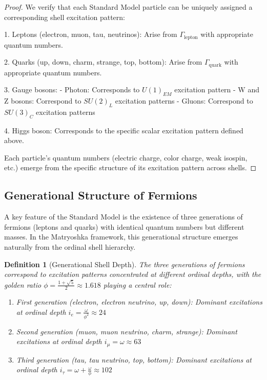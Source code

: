 \documentclass[12pt,a4paper]{article}
\newtheorem{definition}{Definition}[section]
\begin{document}
\begin{proof}
We verify that each Standard Model particle can be uniquely assigned a corresponding shell excitation pattern:

1. Leptons (electron, muon, tau, neutrinos): Arise from $\Gamma_{\text{lepton}}$ with appropriate quantum numbers.

2. Quarks (up, down, charm, strange, top, bottom): Arise from $\Gamma_{\text{quark}}$ with appropriate quantum numbers.

3. Gauge bosons:
   - Photon: Corresponds to $U(1)_{EM}$ excitation pattern
   - W and Z bosons: Correspond to $SU(2)_L$ excitation patterns
   - Gluons: Correspond to $SU(3)_C$ excitation patterns

4. Higgs boson: Corresponds to the specific scalar excitation pattern defined above.

Each particle's quantum numbers (electric charge, color charge, weak isospin, etc.) emerge from the specific structure of its excitation pattern across shells.
\end{proof}

\subsection{Generational Structure of Fermions}
\label{subsec:generations}

A key feature of the Standard Model is the existence of three generations of fermions (leptons and quarks) with identical quantum numbers but different masses. In the Matryoshka framework, this generational structure emerges naturally from the ordinal shell hierarchy.

\begin{definition}[Generational Shell Depth]
\label{def:generation-depth}
The three generations of fermions correspond to excitation patterns concentrated at different ordinal depths, with the golden ratio $\phi = \frac{1+\sqrt{5}}{2} \approx 1.618$ playing a central role:
\begin{enumerate}
    \item First generation (electron, electron neutrino, up, down): Dominant excitations at ordinal depth $i_e = \frac{\omega}{\phi^2} \approx 24$
    \item Second generation (muon, muon neutrino, charm, strange): Dominant excitations at ordinal depth $i_{\mu} = \omega \approx 63$
    \item Third generation (tau, tau neutrino, top, bottom): Dominant excitations at ordinal depth $i_{\tau} = \omega + \frac{\omega}{\phi} \approx 102$
\end{enumerate}
\end{definition}
\end{document}
